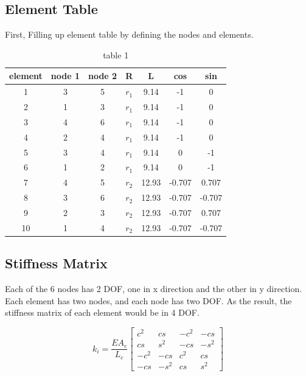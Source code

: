 \documentclass[12pt, a4paper]{article}
\begin{document}
\subsection{Element Table}
    \qquad First, Filling up element table by defining the nodes and elements.
        \begin{table}[h]
        	\caption{table 1}
        	\label{element table}
        	\centering
        	\begin{tabular}{|c||c|c|c|c|c|c|}
        	\hline
        	{element}& {node 1} & {node 2}&{R}&{L}&{cos}&{sin}\\ \hline
        	\hline
        	1   & 3 & 5 & $r_1$ & 9.14  & -1 & 0 \\ \hline
        	2   & 1 & 3 & $r_1$ & 9.14  & -1 &  0\\  \hline
        	3   & 4 & 6 & $r_1$ & 9.14  & -1 &  0\\  \hline
        	4   & 2 & 4 & $r_1$ & 9.14  & -1 &  0\\  \hline
        	5   & 3 & 4 & $r_1$ & 9.14  & 0  & -1\\  \hline
        	6   & 1 & 2 & $r_1$ & 9.14  & 0  & -1\\  \hline
        	7   & 4 & 5 & $r_2$ & 12.93 & -0.707 & 0.707\\ \hline
        	8   & 3 & 6 & $r_2$ & 12.93 & -0.707 & -0.707\\ \hline
        	9   & 2 & 3 & $r_2$ & 12.93 & -0.707 & 0.707\\ \hline
        	10  & 1 & 4 & $r_2$ & 12.93 & -0.707 & -0.707\\ \hline
        	
        	\end{tabular}
        \end{table}
        
\subsection{Stiffness Matrix}
    \qquad Each of the 6 nodes has 2 DOF, one in x direction and the other in y direction. \\
    \qquad Each element has two nodes, and each node has two DOF. As the result, the stiffness matrix of each element would be in 4 DOF.
        
    \begin{equation}
        k_i = \frac{EA_e}{L_e}
    \left[
        \begin{array}{cccc}
             c^2 &cs &-c^2 & -cs \\
             cs &s^2 & -cs& -s^2 \\
             -c^2& -cs& c^2& cs \\
             -cs & -s^2& cs &s^2
        \end{array}
    \right]
    \end{equation}
        
\end{document}
